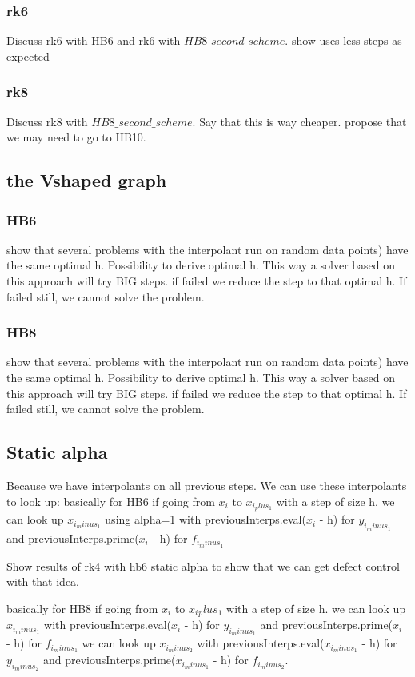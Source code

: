 \documentclass{article}
\begin{document}
\subsubsection{rk6}
Discuss rk6 with HB6 and rk6 with $HB8\_second\_scheme$. 
show uses less steps as expected

\subsubsection{rk8}
Discuss rk8 with $HB8\_second\_scheme$. Say that this is way cheaper. propose that we may need to go to HB10.

\subsection{the Vshaped graph}
\subsubsection{HB6}
show that several problems with the interpolant run on random data points) have the same optimal h. 
Possibility to derive optimal h. This way a solver based on this approach will try BIG steps. if failed we reduce the step to that optimal h. If failed still, we cannot solve the problem.

\subsubsection{HB8}
show that several problems with the interpolant run on random data points) have the same optimal h. 
Possibility to derive optimal h. This way a solver based on this approach will try BIG steps. if failed we reduce the step to that optimal h. If failed still, we cannot solve the problem.

\subsection{Static alpha}
Because we have interpolants on all previous steps. We can use these interpolants to look up:
basically for HB6
	if going from $x_i$ to $x_{i_plus_1}$ with a step of size h.
	we can look up $x_{i_minus_1}$ using alpha=1 with previousInterps.eval($x_i$ - h) for $y_{i_minus_1}$ and previousInterps.prime($x_i$ - h) for $f_{i_minus_1}$
	
Show results of rk4 with hb6 static alpha to show that we can get defect control with that idea.

basically for HB8
		if going from $x_i$ to $x_i{_plus_1}$ with a step of size h.
	we can look up $x_{i_minus_1}$ with previousInterps.eval($x_i$ - h) for $y_{i_minus_1}$ and previousInterps.prime($x_i$ - h) for $f_{i_minus_1}$
	we can look up $x_{i_minus_2}$ with previousInterps.eval($x_{i_minus_1}$ - h) for $y_{i_minus_2}$ and previousInterps.prime($x_{i_minus_1}$ - h) for $f_{i_minus_2}$.
	
\end{document}
